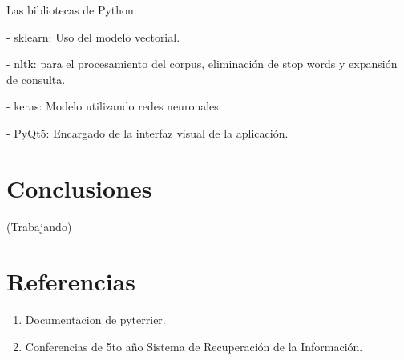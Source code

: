 \documentclass[runningheads]{llncs}
\begin{document}
Las bibliotecas de Python:

-	sklearn: Uso del modelo vectorial.

-	nltk: para el procesamiento del corpus, eliminación de stop words y expansión de consulta.

-	keras: Modelo utilizando redes neuronales.

-	PyQt5: Encargado de la interfaz visual de la aplicación.


\section*{Conclusiones}
(Trabajando)

\section*{Referencias}
\begin{enumerate}
\item Documentacion de pyterrier.
\item Conferencias de 5to año Sistema de Recuperación de la Información.
\end{enumerate} 
\end{document}
